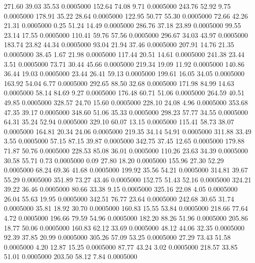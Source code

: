  271.60   39.03   35.53   0.0005000
 152.64   74.08    9.71   0.0005000
 243.76   52.92    9.75   0.0005000
 178.91   35.22   28.64   0.0005000
 122.95   50.77   55.30   0.0005000
  72.66   42.26   21.31   0.0005000
   0.25   51.24   14.49   0.0005000
 286.76   37.18   23.89   0.0005000
  99.55   23.14   17.55   0.0005000
 110.41   59.76   57.56   0.0005000
 296.67   34.03   43.97   0.0005000
 183.74   23.82   44.34   0.0005000
  93.04   21.94   37.46   0.0005000
 207.91   14.76   21.35   0.0005000
  38.45    1.67   21.98   0.0005000
 117.44   20.51   14.61   0.0005000
 241.38   23.44    3.51   0.0005000
  73.71   30.44   45.66   0.0005000
 219.34   19.09   11.92   0.0005000
 140.86   36.44   19.03   0.0005000
  23.44   26.41   59.13   0.0005000
 199.61   16.05   34.05   0.0005000
 163.92   54.04    6.77   0.0005000
 292.65   88.50   32.68   0.0005000
 171.98   84.99   14.63   0.0005000
  58.14   84.69    9.27   0.0005000
 176.48   60.71   51.06   0.0005000
 264.59   40.51   49.85   0.0005000
 328.57   24.70   15.60   0.0005000
 228.10   24.08    4.96   0.0005000
 353.68   47.35   39.17   0.0005000
 348.60   51.06   35.33   0.0005000
 298.23   57.77   34.55   0.0005000
  64.31   35.24   52.94   0.0005000
 329.10   60.07   13.15   0.0005000
 115.41   58.73   38.07   0.0005000
 164.81   20.34   24.06   0.0005000
 219.35   34.14   54.91   0.0005000
 311.88   33.49    3.55   0.0005000
  57.15   87.15   39.87   0.0005000
 342.75   37.45   12.65   0.0005000
 179.88   71.87   50.76   0.0005000
 228.53   85.08   36.01   0.0005000
 110.26   23.63   34.39   0.0005000
  30.58   55.71    0.73   0.0005000
   0.09   27.80   18.20   0.0005000
 155.96   27.30   52.29   0.0005000
  68.24   69.36   41.68   0.0005000
 199.92   35.56   54.21   0.0005000
 314.81   39.67   55.29   0.0005000
 351.89   73.27   43.46   0.0005000
 152.75   51.43   52.16   0.0005000
 324.21   39.22   36.46   0.0005000
  80.66   33.38    9.15   0.0005000
 325.16   22.08    4.05   0.0005000
  26.04   55.63   19.95   0.0005000
 342.51   76.77   23.64   0.0005000
 242.68   30.65   31.74   0.0005000
  35.81   18.92   30.70   0.0005000
 160.83   15.55   53.84   0.0005000
 218.66   77.64    4.72   0.0005000
 196.66   79.59   54.96   0.0005000
 182.20   88.26   51.96   0.0005000
 205.86   18.77   50.06   0.0005000
 160.83   62.12   33.69   0.0005000
  48.12   44.06   32.35   0.0005000
  92.39   37.85   20.99   0.0005000
 305.26   57.09   53.25   0.0005000
  27.29   73.43   51.58   0.0005000
   4.20   12.87   15.25   0.0005000
  87.77   43.24    3.02   0.0005000
 218.57   33.85   51.01   0.0005000
 203.50   58.12    7.84   0.0005000
